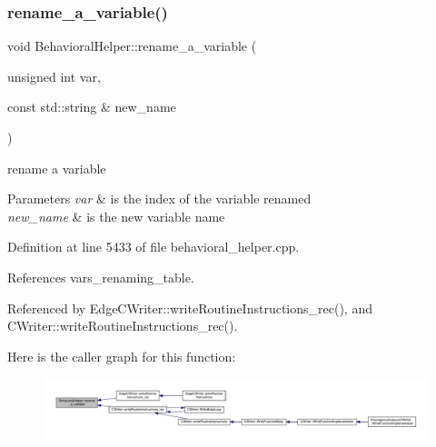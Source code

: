 \mbox{\label{classBehavioralHelper_a0d259d6b58eddaddea64b85eb3047c63}} 
\subsubsection{\texorpdfstring{rename\+\_\+a\+\_\+variable()}{rename\_a\_variable()}}
{\footnotesize\ttfamily void Behavioral\+Helper\+::rename\+\_\+a\+\_\+variable (\begin{DoxyParamCaption}\item[{unsigned int}]{var,  }\item[{const std\+::string \&}]{new\+\_\+name }\end{DoxyParamCaption})\hspace{0.3cm}{\ttfamily [static]}}



rename a variable 


\begin{DoxyParams}{Parameters}
{\em var} & is the index of the variable renamed \\
\hline
{\em new\+\_\+name} & is the new variable name \\
\hline
\end{DoxyParams}


Definition at line 5433 of file behavioral\+\_\+helper.\+cpp.



References vars\+\_\+renaming\+\_\+table.



Referenced by Edge\+C\+Writer\+::write\+Routine\+Instructions\+\_\+rec(), and C\+Writer\+::write\+Routine\+Instructions\+\_\+rec().

Here is the caller graph for this function\+:
\nopagebreak
\begin{figure}[H]
\begin{center}
\leavevmode
\includegraphics[width=350pt]{dd/db2/classBehavioralHelper_a0d259d6b58eddaddea64b85eb3047c63_icgraph}
\end{center}
\end{figure}
\mbox{\label{classBehavioralHelper_a7cfbf77adc6744fcb84150a99a98b2ee}} 

